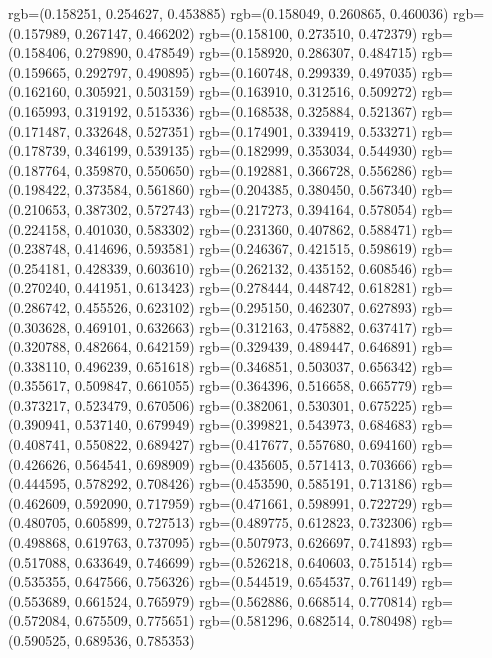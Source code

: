 {{{					rgb=(0.158251, 0.254627, 0.453885)
					rgb=(0.158049, 0.260865, 0.460036)
					rgb=(0.157989, 0.267147, 0.466202)
					rgb=(0.158100, 0.273510, 0.472379)
					rgb=(0.158406, 0.279890, 0.478549)
					rgb=(0.158920, 0.286307, 0.484715)
					rgb=(0.159665, 0.292797, 0.490895)
					rgb=(0.160748, 0.299339, 0.497035)
					rgb=(0.162160, 0.305921, 0.503159)
					rgb=(0.163910, 0.312516, 0.509272)
					rgb=(0.165993, 0.319192, 0.515336)
					rgb=(0.168538, 0.325884, 0.521367)
					rgb=(0.171487, 0.332648, 0.527351)
					rgb=(0.174901, 0.339419, 0.533271)
					rgb=(0.178739, 0.346199, 0.539135)
					rgb=(0.182999, 0.353034, 0.544930)
					rgb=(0.187764, 0.359870, 0.550650)
					rgb=(0.192881, 0.366728, 0.556286)
					rgb=(0.198422, 0.373584, 0.561860)
					rgb=(0.204385, 0.380450, 0.567340)
					rgb=(0.210653, 0.387302, 0.572743)
					rgb=(0.217273, 0.394164, 0.578054)
					rgb=(0.224158, 0.401030, 0.583302)
					rgb=(0.231360, 0.407862, 0.588471)
					rgb=(0.238748, 0.414696, 0.593581)
					rgb=(0.246367, 0.421515, 0.598619)
					rgb=(0.254181, 0.428339, 0.603610)
					rgb=(0.262132, 0.435152, 0.608546)
					rgb=(0.270240, 0.441951, 0.613423)
					rgb=(0.278444, 0.448742, 0.618281)
					rgb=(0.286742, 0.455526, 0.623102)
					rgb=(0.295150, 0.462307, 0.627893)
					rgb=(0.303628, 0.469101, 0.632663)
					rgb=(0.312163, 0.475882, 0.637417)
					rgb=(0.320788, 0.482664, 0.642159)
					rgb=(0.329439, 0.489447, 0.646891)
					rgb=(0.338110, 0.496239, 0.651618)
					rgb=(0.346851, 0.503037, 0.656342)
					rgb=(0.355617, 0.509847, 0.661055)
					rgb=(0.364396, 0.516658, 0.665779)
					rgb=(0.373217, 0.523479, 0.670506)
					rgb=(0.382061, 0.530301, 0.675225)
					rgb=(0.390941, 0.537140, 0.679949)
					rgb=(0.399821, 0.543973, 0.684683)
					rgb=(0.408741, 0.550822, 0.689427)
					rgb=(0.417677, 0.557680, 0.694160)
					rgb=(0.426626, 0.564541, 0.698909)
					rgb=(0.435605, 0.571413, 0.703666)
					rgb=(0.444595, 0.578292, 0.708426)
					rgb=(0.453590, 0.585191, 0.713186)
					rgb=(0.462609, 0.592090, 0.717959)
					rgb=(0.471661, 0.598991, 0.722729)
					rgb=(0.480705, 0.605899, 0.727513)
					rgb=(0.489775, 0.612823, 0.732306)
					rgb=(0.498868, 0.619763, 0.737095)
					rgb=(0.507973, 0.626697, 0.741893)
					rgb=(0.517088, 0.633649, 0.746699)
					rgb=(0.526218, 0.640603, 0.751514)
					rgb=(0.535355, 0.647566, 0.756326)
					rgb=(0.544519, 0.654537, 0.761149)
					rgb=(0.553689, 0.661524, 0.765979)
					rgb=(0.562886, 0.668514, 0.770814)
					rgb=(0.572084, 0.675509, 0.775651)
					rgb=(0.581296, 0.682514, 0.780498)
					rgb=(0.590525, 0.689536, 0.785353)
}}}

